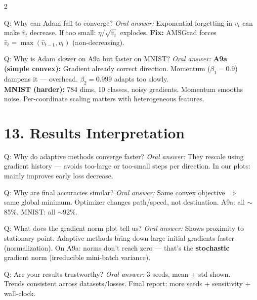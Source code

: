 \documentclass[a4paper,9pt]{article}
\newcommand{\oral}{\textit{\color{darkgray}Oral answer: }}
\begin{document}
\begin{multicols}{2}
\begin{qa}{Q: Why can Adam fail to converge?}
\oral Exponential forgetting in \(v_t\) can make \(\hat v_t\) decrease.
If too small: \(\eta/\sqrt{\hat v_t}\) explodes.
\textbf{Fix:} AMSGrad forces \(\hat v_t = \max(\hat v_{t-1}, v_t)\) (non-decreasing).
\end{qa}

\begin{qa}{Q: Why is Adam slower on A9a but faster on MNIST?}
\oral \textbf{A9a (simple convex):} Gradient already correct direction. Momentum (\(\beta_1=0.9\)) dampens it --- overhead. \(\beta_2=0.999\) adapts too slowly.\\
\textbf{MNIST (harder):} 784 dims, 10 classes, noisy gradients. Momentum smooths noise. Per-coordinate scaling matters with heterogeneous features.
\end{qa}

\section{13. Results Interpretation}

\begin{qa}{Q: Why do adaptive methods converge faster?}
\oral They rescale using gradient history --- avoids too-large or too-small steps per direction.
In our plots: mainly improves early loss decrease.
\end{qa}

\begin{qa}{Q: Why are final accuracies similar?}
\oral Same convex objective \(\Rightarrow\) same global minimum.
Optimizer changes path/speed, not destination.
A9a: all \(\sim\)85\%. MNIST: all \(\sim\)92\%.
\end{qa}

\begin{qa}{Q: What does the gradient norm plot tell us?}
\oral Shows proximity to stationary point.
Adaptive methods bring down large initial gradients faster (normalization).
On A9a: norms don't reach zero --- that's the \textbf{stochastic} gradient norm (irreducible mini-batch variance).
\end{qa}

\begin{qa}{Q: Are your results trustworthy?}
\oral 3 seeds, mean \(\pm\) std shown.
Trends consistent across datasets/losses.
Final report: more seeds + sensitivity + wall-clock.
\end{qa}


\end{multicols}
\end{document}
